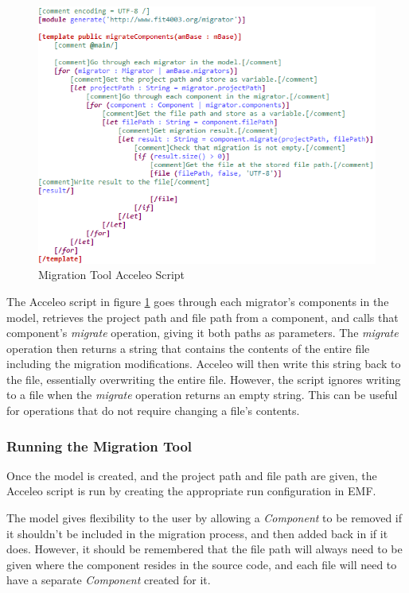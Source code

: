 \documentclass[conference]{IEEEtran}
\begin{document}
\begin{figure}[htbp]
\centerline{\includegraphics[width=\linewidth,keepaspectratio]{acceleo.png}}
\caption{Migration Tool Acceleo Script}
\label{fig:acceleo}
\end{figure}

The Acceleo script in figure \ref{fig:acceleo} goes through each migrator’s components in the model, retrieves the project path and file path from a component, and calls that component’s \textit{migrate} operation, giving it both paths as parameters. The \textit{migrate} operation then returns a string that contains the contents of the entire file including the migration modifications. Acceleo will then write this string back to the file, essentially overwriting the entire file. However, the script ignores writing to a file when the \textit{migrate} operation returns an empty string. This can be useful for operations that do not require changing a file’s contents.

\subsubsection{Running the Migration Tool}

Once the model is created, and the project path and file path are given, the Acceleo script is run by creating the appropriate run configuration in EMF.

The model gives flexibility to the user by allowing a \textit{Component} to be removed if it shouldn’t be included in the migration process, and then added back in if it does. However, it should be remembered that the file path will always need to be given where the component resides in the source code, and each file will need to have a separate \textit{Component} created for it.
\end{document}
